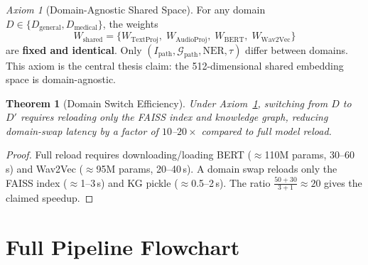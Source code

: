 \documentclass[12pt,a4paper]{article}
\theoremstyle{definition}
\theoremstyle{plain}
\newtheorem{theorem}{Theorem}[section]
\theoremstyle{remark}
\newtheorem{axiom}{Axiom}[section]
\newcommand{\KG}{\mathcal{G}}
\begin{document}
\begin{axiom}[Domain-Agnostic Shared Space]
  \label{ax:shared}
  For any domain $D \in \{D_{\text{general}}, D_{\text{medical}}\}$, the weights
  \[
    W_{\text{shared}} = \{W_{\text{TextProj}},\; W_{\text{AudioProj}},\; W_{\text{BERT}},\; W_{\text{Wav2Vec}}\}
  \]
  are \textbf{fixed and identical}. Only $(I_{\mathrm{path}}, \KG_{\mathrm{path}}, \text{NER}, \tau)$
  differ between domains. This axiom is the central thesis claim: the 512-dimensional
  shared embedding space is domain-agnostic.
\end{axiom}

\begin{theorem}[Domain Switch Efficiency]
  Under Axiom~\ref{ax:shared}, switching from $D$ to $D'$ requires reloading only
  the FAISS index and knowledge graph, reducing domain-swap latency by a factor
  of $10$--$20\times$ compared to full model reload.
\end{theorem}
\begin{proof}
  Full reload requires downloading/loading BERT ($\approx$110M params, 30--60\,s)
  and Wav2Vec ($\approx$95M params, 20--40\,s). A domain swap reloads only the FAISS
  index ($\approx$1--3\,s) and KG pickle ($\approx$0.5--2\,s). The ratio
  $\frac{50+30}{3+1} \approx 20$ gives the claimed speedup.
\end{proof}

\newpage
\section{Full Pipeline Flowchart}
\end{document}
